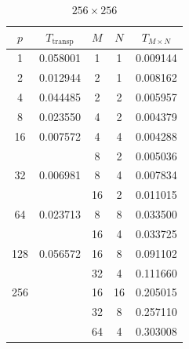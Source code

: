\documentclass[a4paper,11pt]{article}
\begin{document}
\begin{minipage}{6.5cm}
\begin{table}[H]
\begin{tabular}{|cc|ccc|}
\hline
$p$ & $T_\text{transp}$ & $M$ & $N$ & $ T_{M \times N}$ \\ \hline
1 & 0.058001 & 1 & 1 & 0.009144 \\ \hline
2 & 0.012944 & 2 & 1 & 0.008162 \\ \hline
4 & 0.044485 & 2 & 2 & 0.005957 \\ \hline
8 &  0.023550 & 4 & 2 & 0.004379 \\ \hline
16 & 0.007572 & 4 & 4 & 0.004288 \\
 & & 8 & 2 & 0.005036 \\ \hline
32 & 0.006981 & 8 & 4 & 0.007834 \\
& & 16 & 2 & 0.011015 \\ \hline
64 & 0.023713 & 8 & 8 & 0.033500 \\
& & 16 & 4 & 0.033725 \\ \hline
128 & 0.056572 & 16 & 8 & 0.091102 \\
& & 32 & 4 & 0.111660 \\ \hline
256 & & 16 & 16 & 0.205015 \\
& & 32 & 8 & 0.257110 \\
& & 64 & 4 & 0.303008 \\ \hline
\end{tabular}
\caption{$256 \times 256$} \label{tab:256}
\end{table}
\end{minipage}
\end{document}
